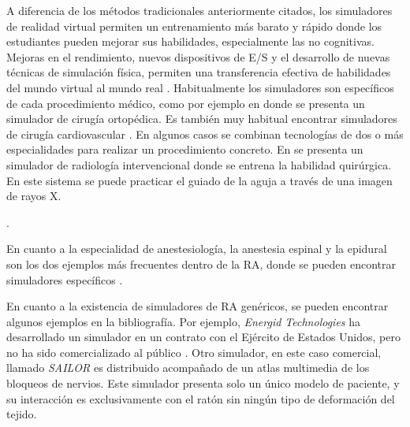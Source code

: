 A diferencia de los métodos tradicionales anteriormente citados, los simuladores de realidad virtual permiten un entrenamiento más barato y rápido donde los estudiantes pueden mejorar sus habilidades, especialmente las no cognitivas. Mejoras en el rendimiento, nuevos dispositivos de \ac{E/S} y el desarrollo de nuevas técnicas de simulación física, permiten una transferencia efectiva de habilidades del mundo virtual al mundo real \cite{dawereview}.
Habitualmente los simuladores son específicos de cada procedimiento médico, como por ejemplo en \cite{cecil2017advanced} donde se presenta un simulador de cirugía ortopédica. Es también muy habitual encontrar simuladores de cirugía cardiovascular \cite{korzeniowski2018vcsim3}. En algunos casos se combinan tecnologías de dos o más especialidades para realizar un procedimiento concreto. En  \cite{villard2014interventional} se presenta un simulador de radiología intervencional donde se entrena la habilidad quirúrgica. En este sistema se puede practicar el guiado de la aguja a través de una imagen de rayos X.

\cite{Willaert2012, ZHANG2017599}. 


En cuanto a la especialidad de anestesiología, la anestesia espinal y la epidural son los dos ejemplos más frecuentes dentro de la \ac{RA}, donde se pueden encontrar simuladores específicos \cite{broom2018evaluation}. %

En cuanto a la existencia de simuladores de \ac{RA} genéricos, se pueden encontrar algunos ejemplos en la bibliografía. Por ejemplo, \emph{Energid Technologies} ha desarrollado  un simulador en un contrato con el Ejército de Estados Unidos, pero no ha sido comercializado al público \cite{lim2008simulation}.
Otro simulador, en este caso comercial, llamado \emph{SAILOR} es distribuido acompañado de un atlas multimedia de los bloqueos de nervios. Este simulador presenta solo un único modelo de paciente, y su interacción es exclusivamente con el ratón sin ningún tipo de deformación del tejido\cite{Bibin}. 

